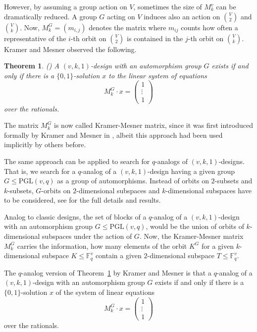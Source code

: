 \documentclass[a4paper, 11pt]{article}
\newtheorem{theorem}{Theorem}[section]
\theoremstyle{definition}
\theoremstyle{definition}
\theoremstyle{definition}
\newcommand{\F}{\mathbb{F}}
\numberwithin{equation}{section}
\begin{document}
However, by assuming a group action on $V$, sometimes the size of $M_{k}^v$ can be
dramatically reduced. 
A group $G$ acting on $V$ induces also an action on $V\choose2$ and $V\choose k$.
Now, $M^G_{k}=(m_{i,j})$ denotes the matrix where $m_{ij}$ counts 
how often a representative of the $i$-th orbit on $V\choose2$
is contained in the $j$-th orbit on $V\choose k$.
Kramer and Mesner observed the following.
\begin{theorem}\label{KM76}(\cite{KramerMesner:76})
	A $(v,k,1)$-design with
	an automorphism group $G$ exists if and only if there is a $\{0,1\}$-solution $x$ to the
	linear system of equations
	\[
	M^G_{k}\cdot x = \begin{pmatrix}1\\ \vdots \\1\end{pmatrix}
	\]
	over the rationals.
\end{theorem}
The matrix $M^G_{k}$ is now called Kramer-Mesner matrix, since 
it was first introduced formally by Kramer and Mesner in \cite{KramerMesner:76}, 
albeit this approach had been used implicitly by others before.

The same approach can be applied to search for $q$-analogs of
$(v,k,1)$-designs. 
That is, we search for a $q$-analog of a $(v,k,1)$-design having a 
given group $G\leq \mbox{PGL}(v, q)$ as a group of automorphisms.
Instead of orbits on $2$-subsets and $k$-subsets, 
$G$-orbits on $2$-dimensional subspaces
and $k$-dimensional subspaces have to be considered, see \cite{qdesignscomputer2017,qdesigns2017}
for the full details and results.

Analog to classic designs, 
the set of blocks of a $q$-analog of a $(v,k,1)$-design with an automorphism group $G\leq \mbox{PGL}(v, q)$,
would be the union of orbits of $k$-dimensional subspaces 
under the action of $G$.
Now, the Kramer-Mesner matrix $M_{k}^G$ carries the information, how many elements of the orbit $K^G$ 
for a given $k$-dimensional  subspace $K\leq \F_{q}^v$ contain a given $2$-dimensional  subspace $T\leq \F_{q}^v$.

The $q$-analog version of Theorem~\ref{KM76} by Kramer and Mesner is that a 
$q$-analog of a $(v,k,1)$-design with an automorphism group $G$ exists if and only if
there is a $\{0,1\}$-solution $x$ of the system of linear equations
\[
M_{k}^G \cdot x = \begin{pmatrix}1\\ \vdots\\ 1\end{pmatrix}
\]
over the rationals.
\end{document}
